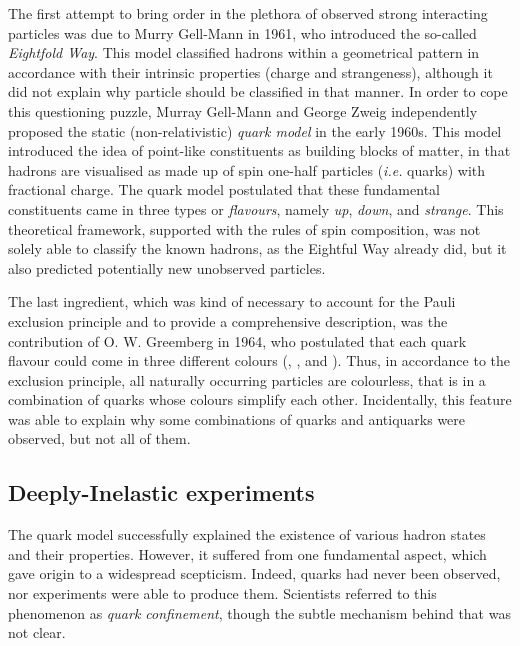 The first attempt to bring order in the plethora of observed strong interacting particles was due to Murry Gell-Mann in 1961, who introduced the so-called \textit{Eightfold Way}. This model classified hadrons within a geometrical pattern in accordance with their intrinsic properties (charge and strangeness), although it did not explain why particle should be classified in that manner. In order to cope this questioning puzzle, Murray Gell-Mann and George Zweig independently proposed the static (non-relativistic) \textit{quark model} in the early 1960s. This model introduced the idea of point-like constituents as building blocks of matter, in that hadrons are visualised as made up of spin one-half particles (\textit{i.e.} quarks) with fractional charge. The quark model postulated that these fundamental constituents came in three types or \textit{flavours}, namely \textit{up}, \textit{down}, and \textit{strange}. This theoretical framework, supported with the rules of spin composition, was not solely able to classify the known hadrons, as the Eightful Way already did, but it also predicted potentially new unobserved particles.%

The last ingredient, which was kind of necessary to account for the Pauli exclusion principle and to provide a comprehensive description, was the contribution of O. W. Greemberg in 1964, who postulated that each quark flavour could come in three different colours (, , and ). Thus, in accordance to the exclusion principle, all naturally occurring particles are colourless, that is in a combination of quarks whose colours simplify each other. Incidentally, this feature was able to explain why some combinations of quarks and antiquarks were observed, but not all of them.%

\subsection*{Deeply-Inelastic experiments}

The quark model successfully explained the existence of various hadron states and their properties. However, it suffered from one fundamental aspect, which gave origin to a widespread scepticism. Indeed, quarks had never been observed, nor experiments were able to produce them. Scientists referred to this phenomenon as \textit{quark confinement}, though the subtle mechanism behind that was not clear.

